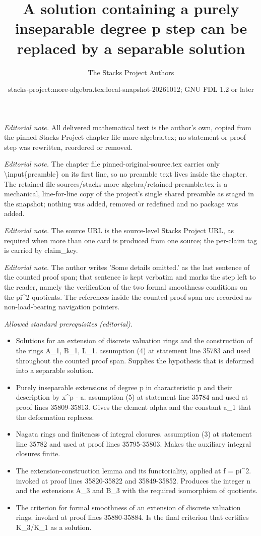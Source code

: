 \documentclass[10pt,a4paper]{amsart}
\title{A solution containing a purely inseparable degree p step can be replaced by a separable solution}
\author{The Stacks Project Authors}
\date{stacks-project:more-algebra.tex:local-snapshot-20261012; GNU FDL 1.2 or later}
\theoremstyle{plain}
\theoremstyle{definition}
\theoremstyle{remark}
\numberwithin{equation}{subsection}
\begin{document}
\maketitle
\setcounter{subsection}{1}
\noindent\textit{Editorial note.} All delivered mathematical text is the author's own, copied from the pinned Stacks Project chapter file more-algebra.tex; no statement or proof step was rewritten, reordered or removed.\par\medskip
\noindent\textit{Editorial note.} The chapter file pinned-original-source.tex carries only \textbackslash{}input\{preamble\} on its first line, so no preamble text lives inside the chapter. The retained file sources/stacks-more-algebra/retained-preamble.tex is a mechanical, line-for-line copy of the project's single shared preamble as staged in the snapshot; nothing was added, removed or redefined and no package was added.\par\medskip
\noindent\textit{Editorial note.} The source URL is the source-level Stacks Project URL, as required when more than one card is produced from one source; the per-claim tag is carried by claim\_key.\par\medskip
\noindent\textit{Editorial note.} The author writes 'Some details omitted.' as the last sentence of the counted proof span; that sentence is kept verbatim and marks the step left to the reader, namely the verification of the two formal smoothness conditions on the pi\textasciicircum{}2-quotients. The references inside the counted proof span are recorded as non-load-bearing navigation pointers.\par\medskip
\noindent\textit{Allowed standard prerequisites (editorial).}\begin{itemize}
\item Solutions for an extension of discrete valuation rings and the construction of the rings A\_1, B\_1, L\_1. assumption (4) at statement line 35783 and used throughout the counted proof span. Supplies the hypothesis that is deformed into a separable solution.
\item Purely inseparable extensions of degree p in characteristic p and their description by x\textasciicircum{}p - a. assumption (5) at statement line 35784 and used at proof lines 35809-35813. Gives the element alpha and the constant a\_1 that the deformation replaces.
\item Nagata rings and finiteness of integral closures. assumption (3) at statement line 35782 and used at proof lines 35795-35803. Makes the auxiliary integral closures finite.
\item The extension-construction lemma and its functoriality, applied at f = pi\textasciicircum{}2. invoked at proof lines 35820-35822 and 35849-35852. Produces the integer n and the extensions A\_3 and B\_3 with the required isomorphism of quotients.
\item The criterion for formal smoothness of an extension of discrete valuation rings. invoked at proof lines 35880-35884. Is the final criterion that certifies K\_3/K\_1 as a solution.
\end{itemize}\medskip
\end{document}
